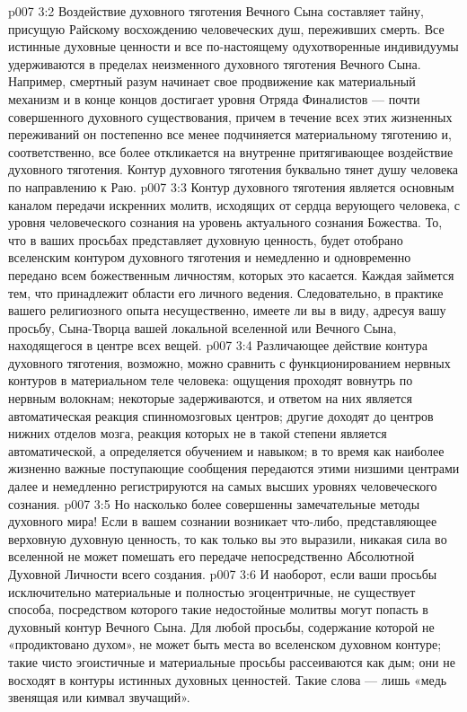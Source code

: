 \vs p007 3:2 Воздействие духовного тяготения Вечного Сына составляет тайну, присущую Райскому восхождению человеческих душ, переживших смерть. Все истинные духовные ценности и все по\hyp{}настоящему одухотворенные индивидуумы удерживаются в пределах неизменного духовного тяготения Вечного Сына. Например, смертный разум начинает свое продвижение как материальный механизм и в конце концов достигает уровня Отряда Финалистов --- почти совершенного духовного существования, причем в течение всех этих жизненных переживаний он постепенно все менее подчиняется материальному тяготению и, соответственно, все более откликается на внутренне притягивающее воздействие духовного тяготения. Контур духовного тяготения буквально тянет душу человека по направлению к Раю.
\vs p007 3:3 \pc Контур духовного тяготения является основным каналом передачи искренних молитв, исходящих от сердца верующего человека, с уровня человеческого сознания на уровень актуального сознания Божества. То, что в ваших просьбах представляет духовную ценность, будет отобрано вселенским контуром духовного тяготения и немедленно и одновременно передано всем божественным личностям, которых это касается. Каждая займется тем, что принадлежит области его личного ведения. Следовательно, в практике вашего религиозного опыта несущественно, имеете ли вы в виду, адресуя вашу просьбу, Сына\hyp{}Творца вашей локальной вселенной или Вечного Сына, находящегося в центре всех вещей.
\vs p007 3:4 \pc Различающее действие контура духовного тяготения, возможно, можно сравнить с функционированием нервных контуров в материальном теле человека: ощущения проходят вовнутрь по нервным волокнам; некоторые задерживаются, и ответом на них является автоматическая реакция спинномозговых центров; другие доходят до центров нижних отделов мозга, реакция которых не в такой степени является автоматической, а определяется обучением и навыком; в то время как наиболее жизненно важные поступающие сообщения передаются этими низшими центрами далее и немедленно регистрируются на самых высших уровнях человеческого сознания.
\vs p007 3:5 Но насколько более совершенны замечательные методы духовного мира! Если в вашем сознании возникает что\hyp{}либо, представляющее верховную духовную ценность, то как только вы это выразили, никакая сила во вселенной не может помешать его передаче непосредственно Абсолютной Духовной Личности всего создания.
\vs p007 3:6 И наоборот, если ваши просьбы исключительно материальные и полностью эгоцентричные, не существует способа, посредством которого такие недостойные молитвы могут попасть в духовный контур Вечного Сына. Для любой просьбы, содержание которой не «продиктовано духом», не может быть места во вселенском духовном контуре; такие чисто эгоистичные и материальные просьбы рассеиваются как дым; они не восходят в контуры истинных духовных ценностей. Такие слова --- лишь «медь звенящая или кимвал звучащий».
